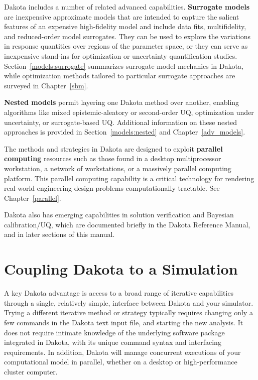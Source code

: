 Dakota includes a number of related advanced capabilities.  {\bf
  Surrogate models} are inexpensive approximate models that are
intended to capture the salient features of an expensive high-fidelity
model and include data fits, multifidelity, and reduced-order model
surrogates.  They can be used to explore the variations in response
quantities over regions of the parameter space, or they can serve as
inexpensive stand-ins for optimization or uncertainty quantification
studies.  Section~\ref{models:surrogate} summarizes surrogate model
mechanics in Dakota, while optimization methods tailored to particular
surrogate approaches are surveyed in Chapter~\ref{sbm}.

{\bf Nested models} permit layering one Dakota method over another,
enabling algorithms like mixed epistemic-aleatory or second-order UQ,
optimization under uncertainty, or surrogate-based UQ.  Additional
information on these nested approaches is provided in
Section~\ref{models:nested} and Chapter~\ref{adv_models}.

The methods and strategies in Dakota are designed to exploit {\bf
  parallel computing} resources such as those found in a desktop
multiprocessor workstation, a network of workstations, or a massively
parallel computing platform. This parallel computing capability is a
critical technology for rendering real-world engineering design
problems computationally tractable.  See Chapter~\ref{parallel}.

Dakota also has emerging capabilities in solution verification and
Bayesian calibration/UQ, which are documented briefly in the Dakota
Reference Manual, and in later sections of this manual.

\section{Coupling Dakota to a Simulation}\label{intro:coupling}

A key Dakota advantage is access to a broad range of iterative
capabilities through a single, relatively simple, interface between
Dakota and your simulator. Trying a different iterative method or
strategy typically requires changing only a few commands in the Dakota
text input file, and starting the new analysis.  It does not require
intimate knowledge of the underlying software package integrated in
Dakota, with its unique command syntax and interfacing requirements.
In addition, Dakota will manage concurrent executions of your
computational model in parallel, whether on a desktop or
high-performance cluster computer.

